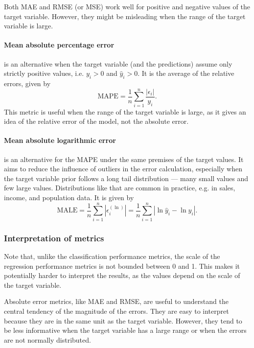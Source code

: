 Both MAE and RMSE (or MSE) work well for positive and negative values of the target
variable.  However, they might be misleading when the range of the target variable is
large.

\paragraph{Mean absolute percentage error} is an alternative when the target variable (and
the predictions) assume only strictly positive values, i.e. $y_i > 0$ and $\hat{y}_i > 0$.
It is the average of the relative errors, given by
\begin{equation*}
  \text{MAPE} = \frac{1}{n} \sum_{i=1}^n \frac{|\epsilon_i|}{y_i}\text{.}
\end{equation*}
This metric is useful when the range of the target variable is large, as it gives an idea
of the relative error of the model, not the absolute error.

\paragraph{Mean absolute logarithmic error} is an alternative for the MAPE under the same
premises of the target values.  It aims to reduce the influence of outliers in the error
calculation, especially when the target variable prior follows a long tail distribution
--- many small values and few large values.  Distributions like that are common in
practice, e.g. in sales, income, and population data.  It is given by
\begin{equation*}
  \text{MALE} = \frac{1}{n} \sum_{i=1}^n | \epsilon_i^{(\ln)} | =
    \frac{1}{n} \sum_{i=1}^n | \ln\hat{y}_i - \ln y_i |\text{.}
\end{equation*}

\subsubsection{Interpretation of metrics}

Note that, unlike the classification performance metrics, the scale of the regression
performance metrics is not bounded between 0 and 1.  This makes it potentially harder to interpret
the results, as the values depend on the scale of the target variable.

Absolute error metrics, like MAE and RMSE, are useful to understand the central tendency
of the magnitude of the errors.  They are easy to interpret because they are in the same
unit as the target variable.  However, they tend to be less informative when the target
variable has a large range or when the errors are not normally distributed.

